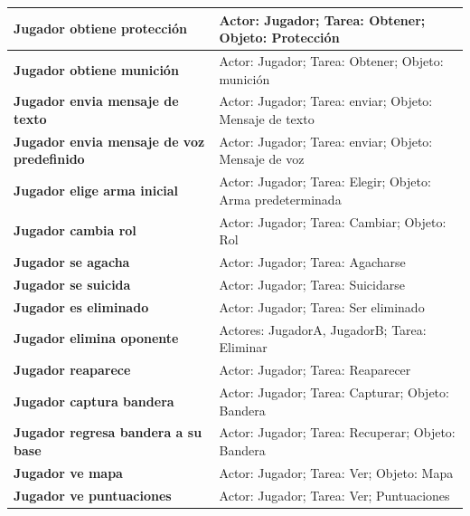 \begin{center}
\begin{longtable}{|p{5cm}|p{8cm}|}
\textbf{Jugador obtiene protecci\'on} & Actor: Jugador; Tarea: Obtener; Objeto: Protecci\'on\\\hline

\textbf{Jugador obtiene munici\'on} & Actor: Jugador; Tarea: Obtener; Objeto: munici\'on\\\hline

\textbf{Jugador envia mensaje de texto} & Actor: Jugador; Tarea: enviar; Objeto: Mensaje de texto\\\hline

\textbf{Jugador envia mensaje de voz predefinido} & Actor: Jugador; Tarea: enviar; Objeto: Mensaje de voz\\\hline

\textbf{Jugador elige arma inicial} & Actor: Jugador; Tarea: Elegir; Objeto: Arma predeterminada\\\hline

\textbf{Jugador cambia rol} & Actor: Jugador; Tarea: Cambiar; Objeto: Rol\\\hline

\textbf{Jugador se agacha} & Actor: Jugador; Tarea: Agacharse\\\hline

\textbf{Jugador se suicida} & Actor: Jugador; Tarea: Suicidarse\\\hline

\textbf{Jugador es eliminado} & Actor: Jugador; Tarea: Ser eliminado\\\hline

\textbf{Jugador elimina oponente} & Actores: JugadorA, JugadorB; Tarea: Eliminar\\\hline

\textbf{Jugador reaparece} & Actor: Jugador; Tarea: Reaparecer\\\hline

\textbf{Jugador captura bandera} & Actor: Jugador; Tarea: Capturar; Objeto: Bandera\\\hline

\textbf{Jugador regresa bandera a su base} & Actor: Jugador; Tarea: Recuperar; Objeto: Bandera \\\hline

\textbf{Jugador ve mapa} & Actor: Jugador; Tarea: Ver; Objeto: Mapa\\\hline

\textbf{Jugador ve puntuaciones} & Actor: Jugador; Tarea: Ver; Puntuaciones\\\hline

\end{longtable}
\end{center}


